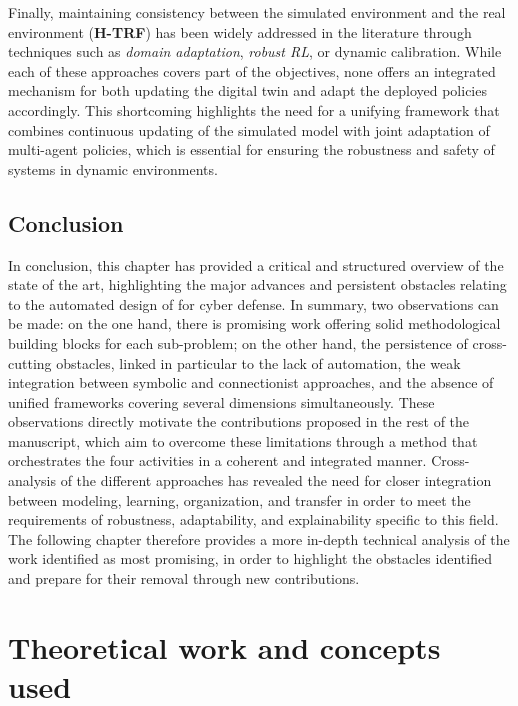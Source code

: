 Finally, maintaining consistency between the simulated environment and the real environment (\textbf{H-TRF}) has been widely addressed in the literature through techniques such as \textit{domain adaptation}, \textit{robust RL}, or dynamic calibration. While each of these approaches covers part of the objectives, none offers an integrated mechanism for both updating the digital twin and adapt the deployed policies accordingly. This shortcoming highlights the need for a unifying framework that combines continuous updating of the simulated model with joint adaptation of multi-agent policies, which is essential for ensuring the robustness and safety of systems in dynamic environments.



\section{Conclusion}
\noindent In conclusion, this chapter has provided a critical and structured overview of the state of the art, highlighting the major advances and persistent obstacles relating to the automated design of  for cyber defense. In summary, two observations can be made: on the one hand, there is promising work offering solid methodological building blocks for each sub-problem; on the other hand, the persistence of cross-cutting obstacles, linked in particular to the lack of automation, the weak integration between symbolic and connectionist approaches, and the absence of unified frameworks covering several dimensions simultaneously. These observations directly motivate the contributions proposed in the rest of the manuscript, which aim to overcome these limitations through a method that orchestrates the four activities in a coherent and integrated manner. Cross-analysis of the different approaches has revealed the need for closer integration between modeling, learning, organization, and transfer in order to meet the requirements of robustness, adaptability, and explainability specific to this field. The following chapter therefore provides a more in-depth technical analysis of the work identified as most promising, in order to highlight the obstacles identified and prepare for their removal through new contributions.

\clearpage
\thispagestyle{empty}
\null
\newpage

\chapter{Theoretical work and concepts used}
\label{chap:concepts}

